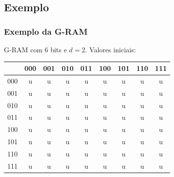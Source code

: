 \documentclass{beamer}
\begin{document}
\subsection{Exemplo}
\begin{frame}
    \frametitle{Exemplo da G-RAM}
    G-RAM com 6 bits e $d = 2$. Valores iniciais:

    \begin{table}
        \centering
        \begin{tabular}{|c|c|c|c|c|c|c|c|c|}
            \hline
                & 000 & 001 & 010 & 011 & 100 & 101 & 110 & 111\\
            \hline
            000 &  u  &  u  &  u  &  u  &  u  &  u  &  u  &  u \\
            \hline
            001 &  u  &  u  &  u  &  u  &  u  &  u  &  u  &  u \\
            \hline
            010 &  u  &  u  &  u  &  u  &  u  &  u  &  u  &  u \\
            \hline
            011 &  u  &  u  &  u  &  u  &  u  &  u  &  u  &  u \\
            \hline
            100 &  u  &  u  &  u  &  u  &  u  &  u  &  u  &  u \\
            \hline
            101 &  u  &  u  &  u  &  u  &  u  &  u  &  u  &  u \\
            \hline
            110 &  u  &  u  &  u  &  u  &  u  &  u  &  u  &  u \\
            \hline
            111 &  u  &  u  &  u  &  u  &  u  &  u  &  u  &  u \\
            \hline

        \end{tabular}
    \end{table}
\end{frame}
\end{document}
